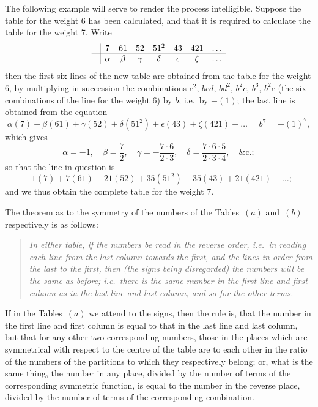\documentclass[11pt,a4paper]{article}
\begin{document}
The following example will serve to render the process intelligible. Suppose
the table for the weight 6 has been calculated, and that it is required to
calculate the table for the weight 7. Write
\[
\begin{array}{c|ccccccc}
& 7 & 61 & 52 & 51^2 & 43 & 421 & \ldots \\ \hline
& \alpha & \beta & \gamma & \delta & \epsilon & \zeta & \ldots
\end{array}
\]
then the first six lines of the new table are obtained from the table for the
weight 6, by multiplying in succession the combinations
$c^2$, $bcd$, $bd^2$, $b^2 c$, $b^3$, $b^2 c$ (the six combinations of the
line for the weight 6) by $b$, i.e.\ by $-(1)$; the last line is obtained
from the equation
\[
\alpha(7) + \beta(61) + \gamma(52) + \delta(51^2) + \epsilon(43) + \zeta(421)
+ \ldots = b^7 = -(1)^7,
\]
which gives
\[\alpha = -1, \quad \beta = \frac{7}{2}, \quad \gamma = -\frac{7\cdot 6}{2\cdot 3},
\quad \delta = \frac{7\cdot 6\cdot 5}{2\cdot 3\cdot 4}, \quad \&\text{c.};\]
so that the line in question is
\[
-1(7) + 7(61) - 21(52) + 35(51^2) - 35(43) + 21(421) - \ldots;
\]
and we thus obtain the complete table for the weight 7.

The theorem as to the symmetry of the numbers of the Tables~$(a)$ and~$(b)$
respectively is as follows:
\begin{quote}
\textit{In either table, if the numbers be read in the reverse order, i.e.\ in
reading each line from the last column towards the first, and the lines in
order from the last to the first, then (the signs being disregarded) the
numbers will be the same as before; i.e.\ there is the same number in the
first line and first column as in the last line and last column, and so for
the other terms.}
\end{quote}

If in the Tables~$(a)$ we attend to the signs, then the rule is, that the
number in the first line and first column is equal to that in the last line
and last column, but that for any other two corresponding numbers, those in
the places which are symmetrical with respect to the centre of the table are
to each other in the ratio of the numbers of the partitions to which they
respectively belong; or, what is the same thing, the number in any place,
divided by the number of terms of the corresponding symmetric function, is
equal to the number in the reverse place, divided by the number of terms of
the corresponding combination.
\end{document}
